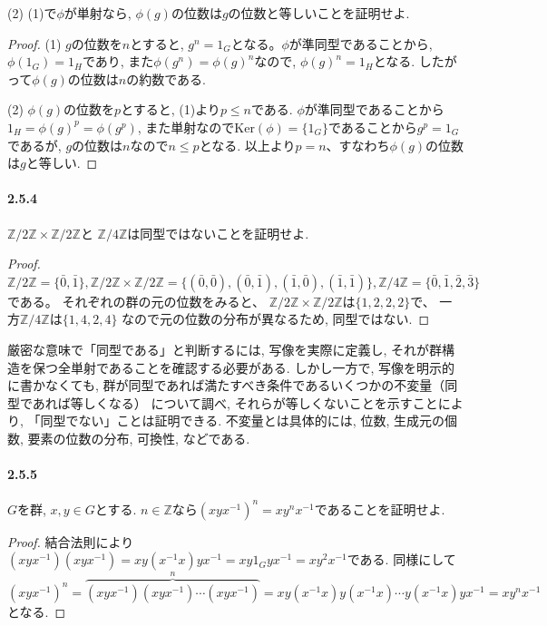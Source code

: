 (2) (1)で$\phi$が単射なら, $\phi(g)$の位数は$g$の位数と等しいことを証明せよ.

\begin{proof}
  (1) $g$の位数を$n$とすると, $g^n=1_G$となる。$\phi$が準同型であることから,
  $\phi(1_G)=1_H$であり, また$\phi(g^n)=\phi(g)^n$なので, $\phi(g)^n=1_H$となる.
  したがって$\phi(g)$の位数は$n$の約数である.
  
  (2) $\phi(g)$の位数を$p$とすると, (1)より$p\leq n$である.
  $\phi$が準同型であることから$1_H=\phi(g)^p=\phi(g^p)$,
  また単射なので$\mathrm{Ker}(\phi) =\{1_G\}$であることから$g^p=1_G$であるが,
  $g$の位数は$n$なので$n \leq p$となる.
  以上より$p=n$、すなわち$\phi(g)$の位数は$g$と等しい.
\end{proof}\leavevmode

\paragraph{2.5.4} $\mathbb{Z}/2\mathbb{Z}\times\mathbb{Z}/2\mathbb{Z}$と
$\mathbb{Z}/4\mathbb{Z}$は同型ではないことを証明せよ.
\begin{proof}
  $\mathbb{Z}/2\mathbb{Z} =\{\bar{0},\bar{1}\},
  \mathbb{Z}/2\mathbb{Z}\times \mathbb{Z}/2\mathbb{Z}
  =\{ (\bar{0},\bar{0}),(\bar{0},\bar{1}),(\bar{1},\bar{0}),(\bar{1},\bar{1}) \},
\mathbb{Z}/4\mathbb{Z}=\{\bar{0},\bar{1},\bar{2},\bar{3}\}$である。
それぞれの群の元の位数をみると、
  $\mathbb{Z}/2\mathbb{Z}\times \mathbb{Z}/2\mathbb{Z}$は$\{1,2,2,2\}$で、
  一方$\mathbb{Z}/4\mathbb{Z}$は$\{1,4,2,4\}$
  なので元の位数の分布が異なるため, 同型ではない.
\end{proof}
厳密な意味で「同型である」と判断するには, 写像を実際に定義し, 
それが群構造を保つ全単射であることを確認する必要がある.
しかし一方で, 写像を明示的に書かなくても, 
群が同型であれば満たすべき条件であるいくつかの不変量（同型であれば等しくなる）
について調べ, それらが等しくないことを示すことにより, 
「同型でない」ことは証明できる. 不変量とは具体的には, 
位数, 生成元の個数, 要素の位数の分布, 可換性, などである.\newline

\paragraph{2.5.5} $G$を群, $x,y \in G$とする. 
$n \in \mathbb{Z}$なら$(xyx^{-1})^n=xy^nx^{-1}$であることを証明せよ.
\begin{proof}
  結合法則により$(xyx^{-1})(xyx^{-1})= xy(x^{-1}x)yx^{-1}=xy1_G yx^{-1}=xy^2x^{-1}$である.
  同様にして　$(xyx^{-1})^n = \overbrace{(xyx^{-1})(xyx^{-1})\cdots(xyx^{-1})}^n
  =xy(x^{-1}x)y(x^{-1}x)\cdots y(x^{-1}x)yx^{-1}=xy^nx^{-1}$
  となる.
\end{proof}\leavevmode

